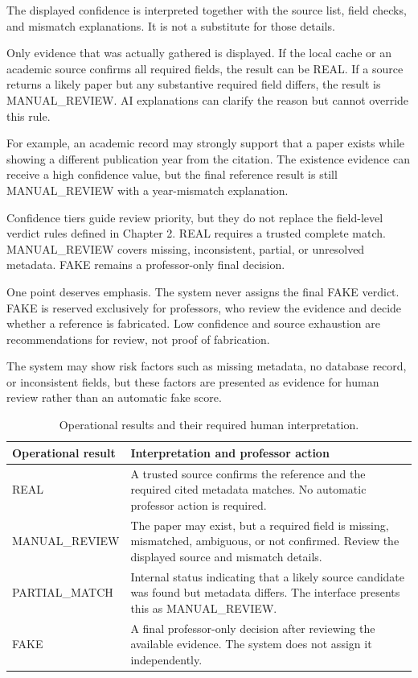 \documentclass[12pt,a4paper,oneside]{report}
\begin{document}
The displayed confidence is interpreted together with the source list, field checks, and mismatch explanations. It is not a substitute for those details.

Only evidence that was actually gathered is displayed. If the local cache or an academic source confirms all required fields, the result can be REAL. If a source returns a likely paper but any substantive required field differs, the result is MANUAL\_REVIEW. AI explanations can clarify the reason but cannot override this rule.

For example, an academic record may strongly support that a paper exists while showing a different publication year from the citation. The existence evidence can receive a high confidence value, but the final reference result is still MANUAL\_REVIEW with a year-mismatch explanation.

Confidence tiers guide review priority, but they do not replace the field-level verdict rules defined in Chapter 2. REAL requires a trusted complete match. MANUAL\_REVIEW covers missing, inconsistent, partial, or unresolved metadata. FAKE remains a professor-only final decision.

One point deserves emphasis. The system never assigns the final FAKE verdict. FAKE is reserved exclusively for professors, who review the evidence and decide whether a reference is fabricated. Low confidence and source exhaustion are recommendations for review, not proof of fabrication.

The system may show risk factors such as missing metadata, no database record, or inconsistent fields, but these factors are presented as evidence for human review rather than an automatic fake score.

\begin{table}[H]
\centering
\begin{tabular}{
    >{\raggedright\arraybackslash}p{}
    >{\raggedright\arraybackslash}p{}
}
\toprule
\textbf{Operational result} & \textbf{Interpretation and professor action} \\
\midrule
REAL & A trusted source confirms the reference and the required cited metadata matches. No automatic professor action is required. \\
MANUAL\_REVIEW & The paper may exist, but a required field is missing, mismatched, ambiguous, or not confirmed. Review the displayed source and mismatch details. \\
PARTIAL\_MATCH & Internal status indicating that a likely source candidate was found but metadata differs. The interface presents this as MANUAL\_REVIEW. \\
FAKE & A final professor-only decision after reviewing the available evidence. The system does not assign it independently. \\
\bottomrule
\end{tabular}
\caption{Operational results and their required human interpretation.}
\label{tab:confidence_tiers}
\end{table}
\end{document}
